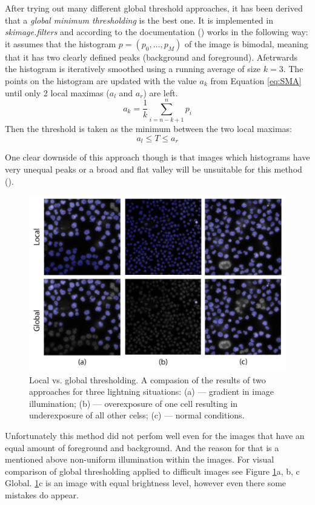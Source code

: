 After trying out many different global threshold approaches, it has been derived that a \textit{global minimum thresholding} is the best one. It is implemented in \textit{skimage.filters} and according to the documentation (\cite{global_thresh}) works in the following way: it assumes that the histogram $p = (p_0, \ldots, p_{M})$ of the image is bimodal, meaning that it has two clearly defined peaks (background and foreground). Afetrwards the histogram is iteratively smoothed using a running average of size $k=3$. The points on the histogram are updated with the value $a_k$ from Equation \ref{eq:SMA} until only 2 local maximas ($a_l$ and $a_r$) are left. 
\begin{equation}
    a_k = \frac{1}{k}\sum_{i=n-k + 1}^{n}p_i
\label{eq:SMA}
\end{equation}
Then the threshold is taken as the minimum between the two local maximas:
\begin{equation}
    a_l \leq T \leq a_r
\end{equation}

One clear downside of this approach though is that images which histograms have very unequal peaks or a broad and flat valley will be unsuitable for this method (\cite{thresholding_skimage}).

\begin{figure}[htb]
	\begin{center}
		\includegraphics[width=0.6\linewidth]{bilder/difficult-lightning/local-vs-global.png}
		\caption[Local vs. global thresholding]%
        {Local vs. global thresholding. A compasion of the results of two approaches for three lightning situations: (a) --- gradient in image illumination; (b) --- overexposure of one cell resulting in underexposure of all other celss; (c) --- normal conditions.}\label{fig:thresholding-bad-conditions}
	\end{center}
\end{figure}

Unfortunately this method did not perfom well even for the images that have an equal amount of foreground and background. And the reason for that is a mentioned above non-uniform illumination within the images. For visual comparison of global thresholding applied to difficult images see Figure \ref{fig:thresholding-bad-conditions}a, b, c Global. \ref{fig:thresholding-bad-conditions}c is an image with equal brightness level, however even there some mistakes do appear.

